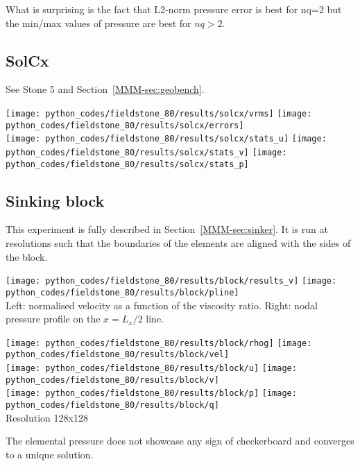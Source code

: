 What is surprising is the fact that L2-norm pressure error is best for nq=2 but the min/max values of pressure
are best for $nq>2$.


\newpage
\subsection*{SolCx}

See Stone 5 and Section~\ref{MMM-sec:geobench}.

\begin{center}
\texttt{[image: python\_codes/fieldstone\_80/results/solcx/vrms]}
\texttt{[image: python\_codes/fieldstone\_80/results/solcx/errors]}\\
\texttt{[image: python\_codes/fieldstone\_80/results/solcx/stats\_u]}
\texttt{[image: python\_codes/fieldstone\_80/results/solcx/stats\_v]}
\texttt{[image: python\_codes/fieldstone\_80/results/solcx/stats\_p]}\\
\end{center}


\newpage
\subsection*{Sinking block}

This experiment is fully described in Section~\ref{MMM-sec:sinker}.
It is run at resolutions such that the boundaries of the elements are aligned with the sides of the block.

\begin{center}
\texttt{[image: python\_codes/fieldstone\_80/results/block/results\_v]}
\texttt{[image: python\_codes/fieldstone\_80/results/block/pline]}\\
{\captionfont Left: normalised velocity as a function of the viscosity ratio. Right: 
nodal pressure profile on the $x=L_x/2$ line.}
\end{center}


\begin{center}
\texttt{[image: python\_codes/fieldstone\_80/results/block/rhog]}
\texttt{[image: python\_codes/fieldstone\_80/results/block/vel]}\\
\texttt{[image: python\_codes/fieldstone\_80/results/block/u]}
\texttt{[image: python\_codes/fieldstone\_80/results/block/v]}\\
\texttt{[image: python\_codes/fieldstone\_80/results/block/p]}
\texttt{[image: python\_codes/fieldstone\_80/results/block/q]}\\
{\captionfont Resolution 128x128}
\end{center}
The elemental pressure does not showcase any sign of checkerboard and converges to a unique solution. 


